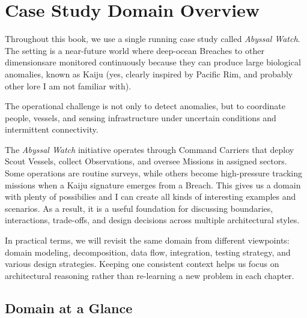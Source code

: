 \chapter{Case Study Domain Overview}

\label{sec:case_study_domain_overview}

Throughout this book, we use a single running case study called \textit{Abyssal Watch}. The setting is a near-future world where deep-ocean Breaches to other dimensionsare monitored continuously because they can produce large biological anomalies, known as Kaiju (yes, clearly inspired by Pacific Rim, and probably other lore I am not familiar with). 

The operational challenge is not only to detect anomalies, but to coordinate people, vessels, and sensing infrastructure under uncertain conditions and intermittent connectivity.

The \textit{Abyssal Watch} initiative operates through Command Carriers that deploy Scout Vessels, collect Observations, and oversee Missions in assigned sectors. Some operations are routine surveys, while others become high-pressure tracking missions when a Kaiju signature emerges from a Breach. This gives us a domain with plenty of possibilies and I can create all kinds of interesting examples and scenarios. As a result, it is a useful foundation for discussing boundaries, interactions, trade-offs, and design decisions across multiple architectural styles.

In practical terms, we will revisit the same domain from different viewpoints: domain modeling, decomposition, data flow, integration, testing strategy, and various design strategies. Keeping one consistent context helps us focus on architectural reasoning rather than re-learning a new problem in each chapter.

\section{Domain at a Glance}

\label{sec:case_study_domain_at_a_glance}

